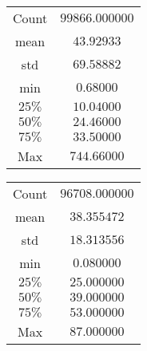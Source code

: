 
\vspace{0.5cm}
\begin{minipage}{\textwidth}
	\begin{minipage}[t]{0.5\textwidth}
		\makeatletter{}
		\begin{center}	
			\begin{tabular}{c|c}
				\toprule
				\midrule
				{Count}
				&  {$99866.000000$} \\
				{mean}
				&  {$43.92933$} \\
				{std}
				&  {$69.58882$} \\
				{min}
				&  {$0.68000$} \\
				{$25\%$}
				&  {$10.04000$} \\
				{$50\%$}
				&  {$24.46000$} \\
				{$75\%$}
				&  {$33.50000$} \\
				{Max}
				&  {$744.66000$} \\
				\bottomrule
			\end{tabular}
		\end{center}	
	\end{minipage}
	\begin{minipage}[t]{0.5\textwidth}
		\makeatletter{}
		\begin{center}	
			\begin{tabular}{c|c}
				\toprule
				\midrule
				{Count}
				&  {$96708.000000$} \\
				{mean}
				&  {$38.355472$} \\
				{std}
				&  {$18.313556$} \\
				{min}
				&  {$ 0.080000$} \\
				{$25\%$}
				&  {$25.000000$} \\
				{$50\%$}
				&  {$39.000000$} \\
				{$75\%$}
				&  {$ 53.000000$} \\
				{Max}
				&  {$87.000000$} \\
				\bottomrule
			\end{tabular}
		\end{center}	
	\end{minipage}
\end{minipage}
\vspace{0.5cm}

